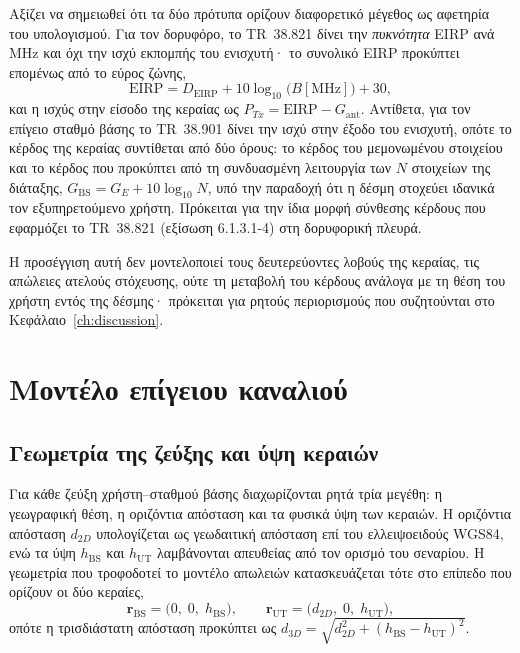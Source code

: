 Αξίζει να σημειωθεί ότι τα δύο πρότυπα ορίζουν διαφορετικό μέγεθος ως
αφετηρία του υπολογισμού. Για τον δορυφόρο, το TR~38.821 δίνει την
\emph{πυκνότητα} EIRP ανά MHz και όχι την ισχύ εκπομπής του ενισχυτή· το
συνολικό EIRP προκύπτει επομένως από το εύρος ζώνης,
\begin{equation}
\text{EIRP} = D_{\text{EIRP}} + 10\log_{10}\!\big(B[\text{MHz}]\big) + 30,
\label{eq:eirp-from-density}
\end{equation}
και η ισχύς στην είσοδο της κεραίας ως $P_{Tx} = \text{EIRP} -
G_{\text{ant}}$. Αντίθετα, για τον επίγειο σταθμό βάσης το TR~38.901 δίνει
την ισχύ στην έξοδο του ενισχυτή, οπότε το κέρδος της κεραίας συντίθεται
από δύο όρους: το κέρδος του μεμονωμένου στοιχείου και το κέρδος που
προκύπτει από τη συνδυασμένη λειτουργία των $N$ στοιχείων της διάταξης,
$G_{\text{BS}} = G_E + 10\log_{10}N$, υπό την παραδοχή ότι η δέσμη
στοχεύει ιδανικά τον εξυπηρετούμενο χρήστη. Πρόκειται για την ίδια μορφή
σύνθεσης κέρδους που εφαρμόζει το TR~38.821 (εξίσωση 6.1.3.1-4) στη
δορυφορική πλευρά.

Η προσέγγιση αυτή δεν μοντελοποιεί τους δευτερεύοντες λοβούς της κεραίας,
τις απώλειες ατελούς στόχευσης, ούτε τη μεταβολή του κέρδους ανάλογα με τη
θέση του χρήστη εντός της δέσμης· πρόκειται για ρητούς περιορισμούς που
συζητούνται στο Κεφάλαιο~\ref{ch:discussion}.

\section{Μοντέλο επίγειου καναλιού}
\label{sec:meth-terrestrial}

\subsection{Γεωμετρία της ζεύξης και ύψη κεραιών}
\label{subsec:meth-geometry}

Για κάθε ζεύξη χρήστη--σταθμού βάσης διαχωρίζονται ρητά τρία μεγέθη: η
γεωγραφική θέση, η οριζόντια απόσταση και τα φυσικά ύψη των κεραιών. Η
οριζόντια απόσταση $d_{2D}$ υπολογίζεται ως γεωδαιτική απόσταση επί του
ελλειψοειδούς WGS84, ενώ τα ύψη $h_{\text{BS}}$ και $h_{\text{UT}}$
λαμβάνονται απευθείας από τον ορισμό του σεναρίου. Η γεωμετρία που
τροφοδοτεί το μοντέλο απωλειών κατασκευάζεται τότε στο επίπεδο που ορίζουν
οι δύο κεραίες,
\begin{equation}
\mathbf{r}_{\text{BS}} = \big(0,\; 0,\; h_{\text{BS}}\big), \qquad
\mathbf{r}_{\text{UT}} = \big(d_{2D},\; 0,\; h_{\text{UT}}\big),
\label{eq:link-geometry}
\end{equation}
οπότε η τρισδιάστατη απόσταση προκύπτει ως
$d_{3D} = \sqrt{d_{2D}^{2} + (h_{\text{BS}} - h_{\text{UT}})^{2}}$.

